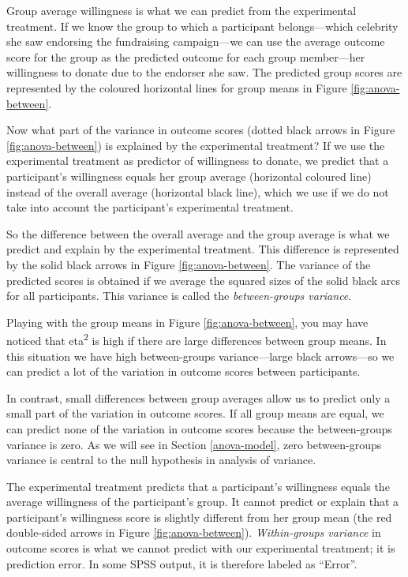 \documentclass[a4paper]{book}
\theoremstyle{definition}
\theoremstyle{definition}
\theoremstyle{definition}
\theoremstyle{remark}
\begin{document}
Group average willingness is what we can predict from the experimental
treatment. If we know the group to which a participant belongs---which
celebrity she saw endorsing the fundraising campaign---we can use the
average outcome score for the group as the predicted outcome for each
group member---her willingness to donate due to the endorser she saw.
The predicted group scores are represented by the coloured horizontal
lines for group means in Figure \ref{fig:anova-between}.

Now what part of the variance in outcome scores (dotted black arrows in
Figure \ref{fig:anova-between}) is explained by the experimental
treatment? If we use the experimental treatment as predictor of
willingness to donate, we predict that a participant's willingness
equals her group average (horizontal coloured line) instead of the
overall average (horizontal black line), which we use if we do not take
into account the participant's experimental treatment.

So the difference between the overall average and the group average is
what we predict and explain by the experimental treatment. This
difference is represented by the solid black arrows in Figure
\ref{fig:anova-between}. The variance of the predicted scores is
obtained if we average the squared sizes of the solid black arcs for all
participants. This variance is called the \emph{between-groups
variance}.

Playing with the group means in Figure \ref{fig:anova-between}, you may
have noticed that eta\textsuperscript{2} is high if there are large
differences between group means. In this situation we have high
between-groups variance---large black arrows---so we can predict a lot
of the variation in outcome scores between participants.

In contrast, small differences between group averages allow us to
predict only a small part of the variation in outcome scores. If all
group means are equal, we can predict none of the variation in outcome
scores because the between-groups variance is zero. As we will see in
Section \ref{anova-model}, zero between-groups variance is central to
the null hypothesis in analysis of variance.

The experimental treatment predicts that a participant's willingness
equals the average willingness of the participant's group. It cannot
predict or explain that a participant's willingness score is slightly
different from her group mean (the red double-sided arrows in Figure
\ref{fig:anova-between}). \emph{Within-groups variance} in outcome
scores is what we cannot predict with our experimental treatment; it is
prediction error. In some SPSS output, it is therefore labeled as
``Error''.
\end{document}
